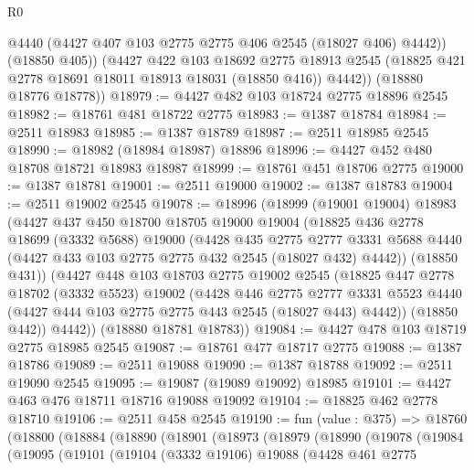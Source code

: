 \begin{lexlean}{R0}
\begin{coremodule}
            @4440
            (@4427 @407 @103 @2775 @2775 @406 @2545 (@18027 @406) @4442))
          (@18850 @405))
        (@4427
          @422
          @103
          @18692
          @2775
          @18913
          @2545
          (@18825 @421 @2778 @18691 @18011 @18913 @18031 (@18850 @416))
          @4442))
      (@18880 @18776 @18778))
@18979 := @4427 @482 @103 @18724 @2775 @18896 @2545
@18982 := @18761 @481 @18722 @2775
@18983 := @1387 @18784
@18984 := @2511 @18983
@18985 := @1387 @18789
@18987 := @2511 @18985 @2545
@18990 := @18982 (@18984 @18987) @18896
@18996 := @4427 @452 @480 @18708 @18721 @18983 @18987
@18999 := @18761 @451 @18706 @2775
@19000 := @1387 @18781
@19001 := @2511 @19000
@19002 := @1387 @18783
@19004 := @2511 @19002 @2545
@19078 := @18996
    (@18999
      (@19001 @19004)
      @18983
      (@4427
        @437
        @450
        @18700
        @18705
        @19000
        @19004
        (@18825
          @436
          @2778
          @18699
          (@3332 @5688)
          @19000
          (@4428
            @435
            @2775
            @2777
            @3331
            @5688
            @4440
            (@4427 @433 @103 @2775 @2775 @432 @2545 (@18027 @432) @4442))
          (@18850 @431))
        (@4427
          @448
          @103
          @18703
          @2775
          @19002
          @2545
          (@18825
            @447
            @2778
            @18702
            (@3332 @5523)
            @19002
            (@4428
              @446
              @2775
              @2777
              @3331
              @5523
              @4440
              (@4427 @444 @103 @2775 @2775 @443 @2545 (@18027 @443) @4442))
            (@18850 @442))
          @4442))
      (@18880 @18781 @18783))
@19084 := @4427 @478 @103 @18719 @2775 @18985 @2545
@19087 := @18761 @477 @18717 @2775
@19088 := @1387 @18786
@19089 := @2511 @19088
@19090 := @1387 @18788
@19092 := @2511 @19090 @2545
@19095 := @19087 (@19089 @19092) @18985
@19101 := @4427 @463 @476 @18711 @18716 @19088 @19092
@19104 := @18825 @462 @2778 @18710
@19106 := @2511 @458 @2545
@19190 := fun (value : @375) =>
  @18760
    (@18800
      (@18884
        (@18890
          (@18901
            (@18973
              (@18979
                (@18990
                  (@19078
                    (@19084
                      (@19095
                        (@19101
                          (@19104
                            (@3332 @19106)
                            @19088
                            (@4428
                              @461
                              @2775

\end{coremodule}
\end{lexlean}
